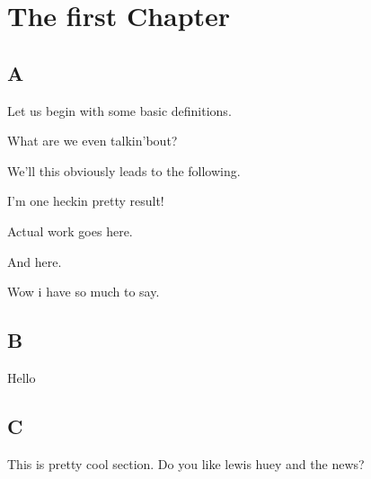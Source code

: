 \chapter{The first Chapter}\label{ch:One}
\section{A}
Let us begin with some basic definitions.
\begin{definition}
What are we even talkin'bout?
\end{definition}
We'll this obviously leads to the following.
\begin{theorem}
I'm one heckin pretty result!
\end{theorem}
\begin{lemma}
Actual work goes here.
\end{lemma}
\begin{lemma}
And here.
\end{lemma}
Wow i have so much to say. \newpage

\section{B}
Hello
\section{C}
This is pretty cool section.\newpage
Do you like lewis huey and the news?